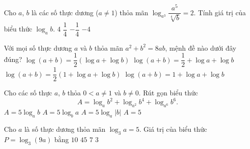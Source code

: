 \begin{ex}%
	Cho $a$, $b$ là các số thực dương ($ a\ne 1$) thỏa mãn  $\log_{a^3} \dfrac{a^5}{\sqrt[4]{b}}=2$. Tính giá trị của biểu thức $\log_a b$.
	\choice 
		{$4$} 
		 {$\dfrac{1}{4}$}
		 {$-\dfrac{1}{4}$}
		{\True $-4$} 
\end{ex}

\begin{ex}%
	Với mọi số thực dương $a$ và $b$ thỏa mãn $a^2+b^2=8ab$, mệnh  đề nào dưới đây đúng?
	 \choice
		{$\log (a+b)=\dfrac{1}{2}  (\log a+\log b)$}
		 {$\log (a+b)=\dfrac{1}{2}+\log a+\log b$}
		{\True $\log (a+b)=\dfrac{1}{2} (1+\log  a+\log b)$}
		{$\log (a+b)=1+\log  a+\log b$}
\end{ex}

\begin{ex}%
	Cho các số thực $ a$, $ b$ thỏa  $ 0 < a\ne 1$ và $ b\ne 0$. Rút gọn biểu thức $$ A=\log_a{b^2}+\log_{a^2}{b^4}+\log_{a^6}{b^6}.$$
	\choice 
		{$  A=5\log_ab$}
		 {$ A=5\log_ba$}
		{\True $  A=5\log_a\left| b\right|$}
		{$ A=5$} 
\end{ex}

\begin{ex}%
	Cho $a$ là  số thực dương thỏa mãn $\log_3a=5$. Giá trị của biểu thức $P=\log_3(9a)$ bằng
	 \choice
		{$10$} 
		 {$45$}
		 {\True $7$}
		 {$3$}
\end{ex}

